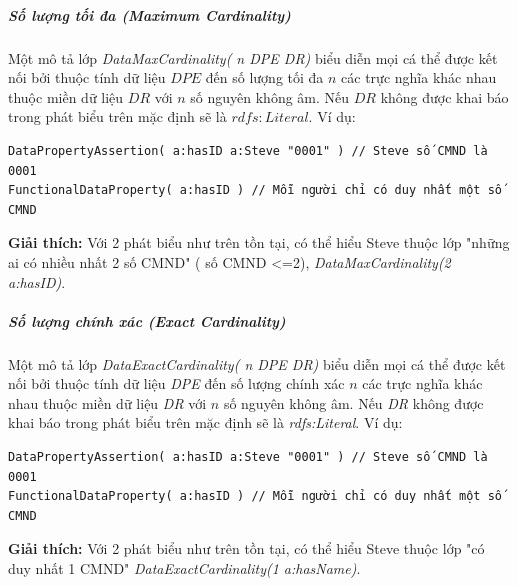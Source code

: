 \subparagraph{Số lượng tối đa (Maximum Cardinality)} Một mô tả lớp \textit{DataMaxCardinality( n DPE DR)} biểu diễn mọi cá thể được kết nối bởi thuộc tính dữ liệu $DPE$ đến số lượng tối đa $n$ các trực nghĩa khác nhau thuộc miền dữ liệu  $DR$ với $n$ số nguyên không âm. Nếu $DR$ không được khai báo trong phát biểu trên mặc định sẽ là $rdfs:Literal$. Ví dụ:
\begin{verbatim}
DataPropertyAssertion( a:hasID a:Steve "0001" ) // Steve số CMND là 0001
FunctionalDataProperty( a:hasID ) // Mỗi người chỉ có duy nhất một số CMND
\end{verbatim}
\textbf{Giải thích:} Với 2 phát biểu như trên tồn tại, có thể hiểu Steve thuộc lớp "những ai có nhiều nhất 2 số CMND" ( số CMND <=2), \textit{DataMaxCardinality(2 a:hasID)}.

\subparagraph{Số lượng chính xác (Exact Cardinality)} Một mô tả lớp \textit{DataExactCardinality( n DPE DR)}  biểu diễn mọi cá thể được kết nối bởi thuộc tính dữ liệu \textit{DPE} đến số lượng chính xác $n$ các trực nghĩa khác nhau thuộc miền dữ liệu  \textit{DR} với $n$ số nguyên không âm. Nếu \textit{DR} không được khai báo trong phát biểu trên mặc định sẽ là \textit{rdfs:Literal}. Ví dụ:
\begin{verbatim}
DataPropertyAssertion( a:hasID a:Steve "0001" ) // Steve số CMND là 0001
FunctionalDataProperty( a:hasID ) // Mỗi người chỉ có duy nhất một số CMND
\end{verbatim}
\textbf{Giải thích:} Với 2 phát biểu như trên tồn tại, có thể hiểu Steve thuộc lớp "có duy nhất 1 CMND" \textit{DataExactCardinality(1 a:hasName)}.

